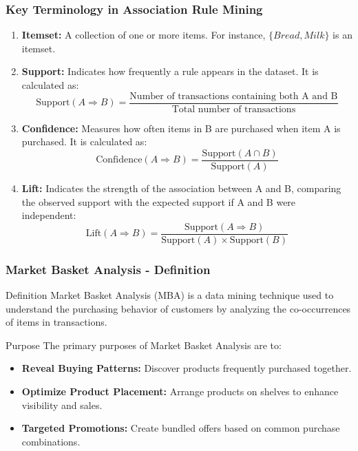 \documentclass[aspectratio=169]{beamer}
\begin{document}
\begin{frame}[fragile]
    \frametitle{Key Terminology in Association Rule Mining}
    \begin{enumerate}
        \item \textbf{Itemset:} A collection of one or more items. For instance, $\{Bread, Milk\}$ is an itemset.
        
        \item \textbf{Support:} Indicates how frequently a rule appears in the dataset. It is calculated as:
        \begin{equation}
            \text{Support}(A \Rightarrow B) = \frac{\text{Number of transactions containing both A and B}}{\text{Total number of transactions}}
        \end{equation}
        
        \item \textbf{Confidence:} Measures how often items in B are purchased when item A is purchased. It is calculated as:
        \begin{equation}
            \text{Confidence}(A \Rightarrow B) = \frac{\text{Support}(A \cap B)}{\text{Support}(A)}
        \end{equation}
        
        \item \textbf{Lift:} Indicates the strength of the association between A and B, comparing the observed support with the expected support if A and B were independent:
        \begin{equation}
            \text{Lift}(A \Rightarrow B) = \frac{\text{Support}(A \Rightarrow B)}{\text{Support}(A) \times \text{Support}(B)}
        \end{equation}
    \end{enumerate}
\end{frame}

\begin{frame}[fragile]
    \frametitle{Market Basket Analysis - Definition}
    \begin{block}{Definition}
        Market Basket Analysis (MBA) is a data mining technique used to understand the purchasing behavior of customers by analyzing the co-occurrences of items in transactions. 
    \end{block}
    \begin{block}{Purpose}
        The primary purposes of Market Basket Analysis are to:
        \begin{itemize}
            \item \textbf{Reveal Buying Patterns:} Discover products frequently purchased together.
            \item \textbf{Optimize Product Placement:} Arrange products on shelves to enhance visibility and sales.
            \item \textbf{Targeted Promotions:} Create bundled offers based on common purchase combinations.
        \end{itemize}
    \end{block}
\end{frame}
\end{document}
